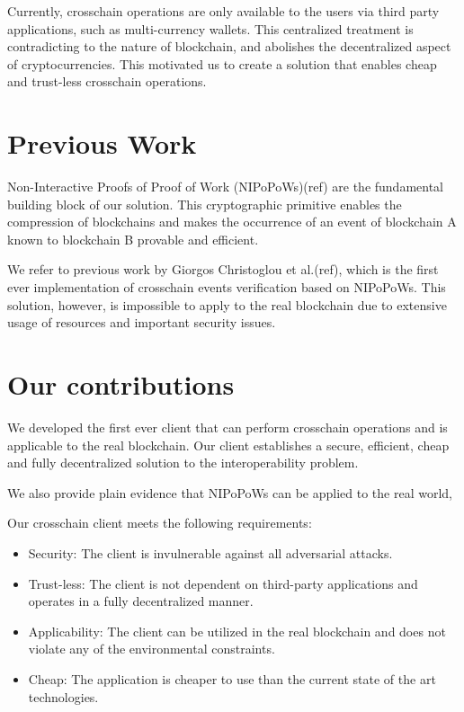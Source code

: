 Currently, crosschain operations are only available to the users via third
party applications, such as multi-currency wallets. This centralized treatment
is contradicting to the nature of blockchain, and abolishes the decentralized
aspect of cryptocurrencies. This motivated us to create a solution that enables
cheap and trust-less crosschain operations.

\section{Previous Work}

Non-Interactive Proofs of Proof of Work (NIPoPoWs)(ref) are the fundamental
building block of our solution. This cryptographic primitive enables the
compression of blockchains and makes the occurrence of an event of blockchain A
known to blockchain B provable and efficient.

We refer to previous work by Giorgos Christoglou et al.(ref), which is the
first ever implementation of crosschain events verification based on NIPoPoWs.
This solution, however, is impossible to apply to the real blockchain due to
extensive usage of resources and important security issues.

\section{Our contributions}


We developed the first ever client that can perform crosschain operations and
is applicable to the real blockchain. Our client establishes a secure,
efficient, cheap and fully decentralized solution to the interoperability
problem.

We also provide plain evidence that NIPoPoWs can be applied to the real world,

Our crosschain client meets the following requirements:
\begin{itemize}
    \item
        Security: The client is invulnerable against all adversarial attacks.
    \item
        Trust-less: The client is not dependent on third-party applications
        and operates in a fully decentralized manner.
    \item
        Applicability: The client can be utilized in the real blockchain and
        does not violate any of the environmental constraints.
    \item
        Cheap: The application is cheaper to use than the current state of the
        art technologies.
\end{itemize}

